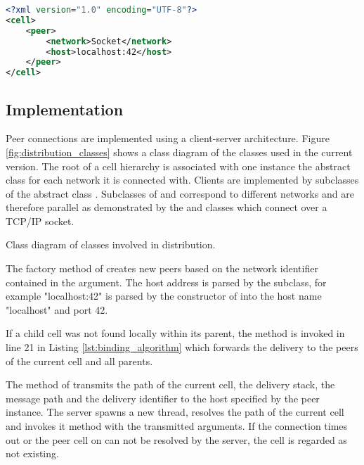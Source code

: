 \begin{lstlisting}[mathescape, float=htbp, label=lst:peer_definition, 
caption=Cell definition file with peer definition, language=XML]
<?xml version="1.0" encoding="UTF-8"?>
<cell>
	<peer>
		<network>Socket</network>
		<host>localhost:42</host>
	</peer>
</cell>
\end{lstlisting}

\subsection{Implementation}

Peer connections are implemented using a client-server architecture. Figure \ref{fig:distribution_classes} shows a class diagram of the classes used in the current version. The root of a cell hierarchy is associated with one instance the abstract class  for each network it is connected with. Clients are implemented by subclasses of the abstract class . Subclasses of  and  correspond to different networks and are therefore parallel as demonstrated by the  and  classes which connect over a TCP/IP socket.

{Class diagram of classes involved in distribution.}

The factory method  of  creates new peers based on the network identifier contained in the  argument. The host address is parsed by the subclass, for example "localhost:42" is parsed by the constructor of  into the host name "localhost" and port 42.

If a child cell was not found locally within its parent, the method  is invoked in line 21 in Listing \ref{lst:binding_algorithm} which forwards the delivery to the peers of the current cell and all parents.

The  method of  transmits the path of the current cell, the delivery stack, the message path and the delivery identifier to the host specified by the peer instance. The server spawns a new thread, resolves the path of the current cell and invokes it  method with the transmitted arguments. If the connection times out or the peer cell on can not be resolved by the server, the cell is regarded as not existing.

